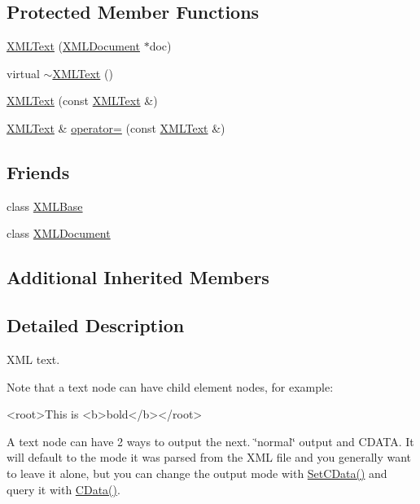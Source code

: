 \subsection*{Protected Member Functions}
\begin{DoxyCompactItemize}
\item 
\hyperlink{classtinyxml2_1_1_x_m_l_text_ad9f46d70e61e5386ead93728d8b90267}{X\-M\-L\-Text} (\hyperlink{classtinyxml2_1_1_x_m_l_document}{X\-M\-L\-Document} $\ast$doc)
\item 
virtual \hyperlink{classtinyxml2_1_1_x_m_l_text_ae9b8790d0dc13914394dbd7437c0e59d}{$\sim$\-X\-M\-L\-Text} ()
\item 
\hyperlink{classtinyxml2_1_1_x_m_l_text_a002156e1f61ee6d48e5368b7cca25582}{X\-M\-L\-Text} (const \hyperlink{classtinyxml2_1_1_x_m_l_text}{X\-M\-L\-Text} \&)
\item 
\hyperlink{classtinyxml2_1_1_x_m_l_text}{X\-M\-L\-Text} \& \hyperlink{classtinyxml2_1_1_x_m_l_text_ad8c9f398d92fa472e213b89d8483ae8f}{operator=} (const \hyperlink{classtinyxml2_1_1_x_m_l_text}{X\-M\-L\-Text} \&)
\end{DoxyCompactItemize}
\subsection*{Friends}
\begin{DoxyCompactItemize}
\item 
class \hyperlink{classtinyxml2_1_1_x_m_l_text_a449202cfc89e7ae5c2f81995476f9ec1}{X\-M\-L\-Base}
\item 
class \hyperlink{classtinyxml2_1_1_x_m_l_text_a4eee3bda60c60a30e4e8cd4ea91c4c6e}{X\-M\-L\-Document}
\end{DoxyCompactItemize}
\subsection*{Additional Inherited Members}


\subsection{Detailed Description}
X\-M\-L text.

Note that a text node can have child element nodes, for example\-: \begin{DoxyVerb}<root>This is <b>bold</b></root>
\end{DoxyVerb}


A text node can have 2 ways to output the next. \char`\"{}normal\char`\"{} output and C\-D\-A\-T\-A. It will default to the mode it was parsed from the X\-M\-L file and you generally want to leave it alone, but you can change the output mode with \hyperlink{classtinyxml2_1_1_x_m_l_text_ad080357d76ab7cc59d7651249949329d}{Set\-C\-Data()} and query it with \hyperlink{classtinyxml2_1_1_x_m_l_text_a125574fe49da80efbae1349f20d02d41}{C\-Data()}. 

